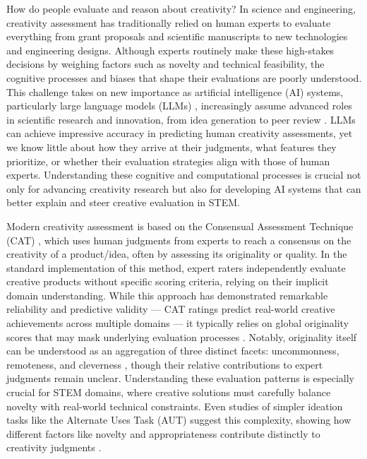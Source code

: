 How do people evaluate and reason about creativity? In science and engineering, creativity assessment has traditionally relied on human experts to evaluate everything from grant proposals and scientific manuscripts to new technologies and engineering designs. Although experts routinely make these high-stakes decisions by weighing factors such as novelty and technical feasibility, the cognitive processes and biases that shape their evaluations are poorly understood. This challenge takes on new importance as artificial intelligence (AI) systems, particularly large language models (LLMs) \citep{brown2020language,ouyang2022training}, increasingly assume advanced roles in scientific research and innovation, from idea generation to peer review \citep{boiko2023emergent, d2024marg, lu2024ai,si2024can, wang-etal-2024-scimon}. LLMs can achieve impressive accuracy in predicting human creativity assessments, yet we know little about how they arrive at their judgments, what features they prioritize, or whether their evaluation strategies align with those of human experts. Understanding these cognitive and computational processes is crucial not only for advancing creativity research but also for developing AI systems that can better explain and steer creative evaluation in STEM.

Modern creativity assessment is based on the Consensual Assessment Technique (CAT) \citep{amabile1982social,silvia2008assessing}, which uses human judgments from experts to reach a consensus on the creativity of a product/idea, often by assessing its originality or quality. In the standard implementation of this method, expert raters independently evaluate creative products without specific scoring criteria, relying on their implicit domain understanding. While this approach has demonstrated remarkable reliability and predictive validity --- CAT ratings predict real-world creative achievements across multiple domains \citep{silvia2008assessing} --- it typically relies on global originality scores that may mask underlying evaluation processes \citep{Cseh2019}. Notably, originality itself can be understood as an aggregation of three distinct facets: uncommonness, remoteness, and cleverness \citep{silvia2008assessing}, though their relative contributions to expert judgments remain unclear. Understanding these evaluation patterns is especially crucial for STEM domains, where creative solutions must carefully balance novelty with real-world technical constraints. Even studies of simpler ideation tasks like the Alternate Uses Task (AUT) suggest this complexity, showing how different factors like novelty and appropriateness contribute distinctly to creativity judgments \citep{Diedrich2015}.

